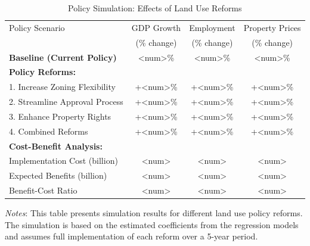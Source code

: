 \begin{table}[ht]
\centering
\caption{Policy Simulation: Effects of Land Use Reforms}
\label{tab:policy}
\begin{tabular}{lccc}
\toprule
Policy Scenario & GDP Growth & Employment & Property Prices \\
 & (\% change) & (\% change) & (\% change) \\
\midrule
\textbf{Baseline (Current Policy)} & <num>\% & <num>\% & <num>\% \\
\midrule
\textbf{Policy Reforms:} \\
1. Increase Zoning Flexibility & +<num>\% & +<num>\% & +<num>\% \\
2. Streamline Approval Process & +<num>\% & +<num>\% & +<num>\% \\
3. Enhance Property Rights & +<num>\% & +<num>\% & +<num>\% \\
4. Combined Reforms & +<num>\% & +<num>\% & +<num>\% \\
\midrule
\textbf{Cost-Benefit Analysis:} \\
Implementation Cost (billion) & <num> & <num> & <num> \\
Expected Benefits (billion) & <num> & <num> & <num> \\
Benefit-Cost Ratio & <num> & <num> & <num> \\
\bottomrule
\end{tabular}
\begin{tablenotes}
\small
\item \textit{Notes}: This table presents simulation results for different land use policy reforms. The simulation is based on the estimated coefficients from the regression models and assumes full implementation of each reform over a 5-year period.
\end{tablenotes}
\end{table}

